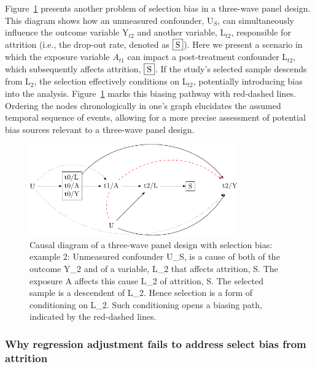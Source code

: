 \documentclass[
  singlecolumn]{article}
\begin{document}
Figure~\ref{fig-dag-8-2} presents another problem of selection bias in a
three-wave panel design. This diagram shows how an unmeasured
confounder, U\(_S\), can simultaneously influence the outcome variable
Y\(_{t2}\) and another variable, L\(_{t2}\), responsible for attrition
(i.e., the drop-out rate, denoted as \(\framebox{S}\)). Here we present
a scenario in which the exposure variable \(A_{t1}\) can impact a
post-treatment confounder L\(_{t2}\), which subsequently affects
attrition, \(\framebox{S}\). If the study's selected sample descends
from L\(_2\), the selection effectively conditions on L\(_{t2}\),
potentially introducing bias into the analysis. Figure~\ref{fig-dag-8-2}
marks this biasing pathway with red-dashed lines. Ordering the nodes
chronologically in one's graph elucidates the assumed temporal sequence
of events, allowing for a more precise assessment of potential bias
sources relevant to a three-wave panel design.

\begin{figure}

{\centering \includegraphics[width=0.8\textwidth,height=\textheight]{causal-dags_files/figure-pdf/fig-dag-8-2-1.pdf}

}

\caption{\label{fig-dag-8-2}Causal diagram of a three-wave panel design
with selection bias: example 2: Unmeasured confounder U\_S, is a cause
of both of the outcome Y\_2 and of a variable, L\_2 that affects
attrition, S. The exposure A affects this cause L\_2 of attrition, S.
The selected sample is a descendent of L\_2. Hence selection is a form
of conditioning on L\_2. Such conditioning opens a biasing path,
indicated by the red-dashed lines.}

\end{figure}

\hypertarget{why-regression-adjustment-fails-to-address-select-bias-from-attrition}{%
\subsubsection{Why regression adjustment fails to address select bias
from
attrition}\label{why-regression-adjustment-fails-to-address-select-bias-from-attrition}}
\end{document}
